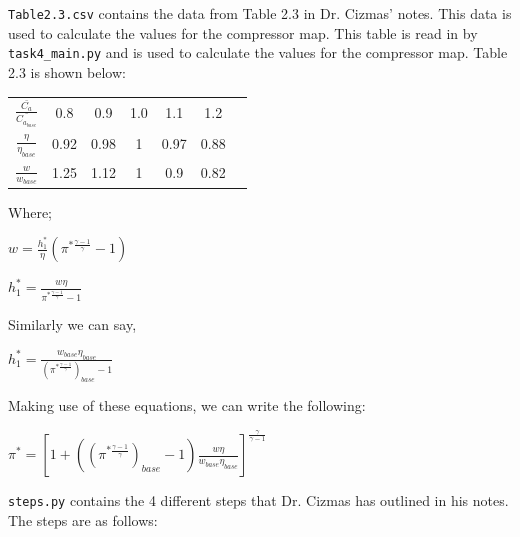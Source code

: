 \documentclass[12pt,english]{article}
\begin{document}
\vspace*{3pt}

\verb|Table2.3.csv| contains the data from Table 2.3 in Dr. Cizmas' notes. This data is used to calculate the values for the compressor map. This table is read in by \verb|task4_main.py| and is used to calculate the values for the compressor map. Table 2.3 is shown below:

\begin{center}
    \begin{tabular}{ c c c c c c c }
     $\frac{\bar{C_{a}}}{\bar{C_{a_{base}}}}$ & 0.8 & 0.9 & 1.0 & 1.1 & 1.2 \\ 
        $\frac{\eta}{\eta_{base}}$ & 0.92 & 0.98 & 1 & 0.97 & 0.88 \\
        $\frac{w}{w_{base}}$ & 1.25 & 1.12 & 1 & 0.9 & 0.82 \\ 
    \end{tabular}
    \end{center}

\vspace*{3pt}
    
    Where;
\begin{center}
    $w = \frac{h^{*}_{1}}{\eta} (\pi^{* \frac{\gamma - 1}{\gamma}} - 1)$
    
    \vspace*{3pt}
    
    $h^{*}_{1} = \frac{w \eta}{\pi^{* \frac{\gamma - 1}{\gamma}} - 1}$
\end{center}

\vspace*{3pt}

Similarly we can say,

\begin{center}
    $h^{*}_{1} = \frac{w_{base} \eta_{base}}{(\pi^{* \frac{\gamma-1}{\gamma}})_{base} - 1}$

\end{center}

\vspace*{3pt}

Making use of these equations, we can write the following:

\begin{center}
    $\pi^{ * } = \left[ 1 + ((\pi^{ * \frac{\gamma - 1}{\gamma}})_{base} -1) \frac{w \eta}{w_{base} \eta_{base}} \right] ^{\frac{\gamma}{\gamma - 1}}$
\end{center}

\verb|steps.py| contains the 4 different steps that Dr. Cizmas has outlined in his notes. The steps are as follows:
\end{document}
